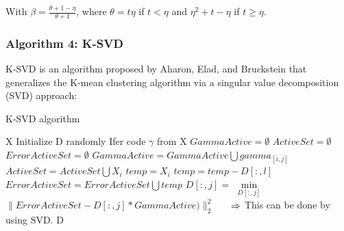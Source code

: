 With $\beta = \frac{\theta + 1 - \eta}{\theta +1}$, where $\theta = t \eta$ if $ t < \eta$ and $\eta^2 + t - \eta$ if $t \geq \eta$.


\subsubsection{Algorithm 4: K-SVD}
K-SVD is an algorithm proposed by Aharon, Elad, and Bruckstein \cite{1710377} that generalizes the K-mean clustering algorithm via a singular value decomposition (SVD) approach:

\begin{algorithm}
 \caption{K-SVD algorithm}
 \begin{algorithmic}
  \REQUIRE X
  \STATE Initialize D randomly
  \STATE  Ifer code $\gamma$ from X
    \STATE $GammaActive = \emptyset $
    \STATE $ActiveSet = \emptyset$
    \STATE $ErrorActiveSet = \emptyset$
            \STATE $GammaActive = GammaActive \bigcup gamma_{[i,j]}$
            \STATE $ActiveSet = ActiveSet \bigcup X_i$
            \STATE $temp = X_i$
                \STATE $temp = temp - D[:,l] $
            \ENDFOR
            \STATE $ErrorActiveSet = ErrorActiveSet \bigcup temp$
        \ENDIF
    \ENDFOR
    \STATE $D[:,j] = $ $\underset{D[:,j]}{\min}$ $\|ErrorActiveSet - D[:,j]*GammaActive)\|^2_2$   $
    \hspace{0.5cm}\Rightarrow$ This can be done by using SVD. 
  \ENDFOR
  \RETURN D
 \end{algorithmic}

\end{algorithm}
